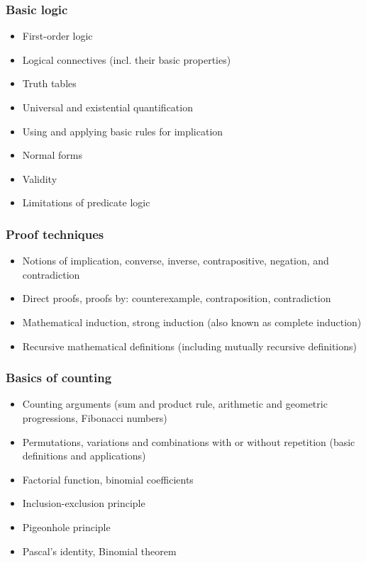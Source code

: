 \documentclass[12pt]{article}
\begin{document}
		\subsubsection{Basic logic}
		\begin{itemize}[label=]
			\item First-order logic
			\item Logical connectives (incl. their basic properties)
			\item Truth tables
			\item Universal and existential quantification
			\item Using and applying basic rules for implication
		\end{itemize}
	
		\begin{itemize}[label=]
			\item Normal forms
			\item Validity
			\item Limitations of predicate logic
		\end{itemize}
	
		\subsubsection{Proof techniques}
		\begin{itemize}[label=]
			\item Notions of implication, converse, inverse, contrapositive, negation, and contradiction
			\item Direct proofs, proofs by: counterexample, contraposition, contradiction
			\item Mathematical induction, strong induction (also known as complete induction)
			\item Recursive mathematical definitions (including mutually recursive definitions)
		\end{itemize}
		
		\subsubsection{Basics of counting}
		\begin{itemize}[label=]
			\item Counting arguments (sum and product rule, arithmetic and geometric progressions, Fibonacci numbers)
			\item Permutations, variations and combinations with or without repetition (basic definitions and applications) 
			\item Factorial function, binomial coefficients
			\item Inclusion-exclusion principle
			\item Pigeonhole principle
			\item Pascal’s identity, Binomial theorem
		\end{itemize}
		
\end{document}

